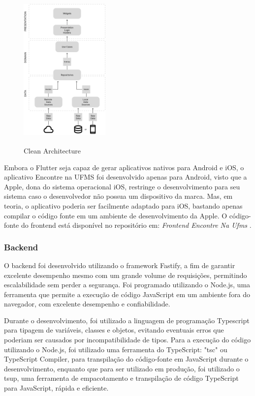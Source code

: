     \begin{figure}[h]
        \centering
        \includegraphics[width=44mm,height=80mm]{imagens/cleanarch.png}
        \caption{\scriptsize Clean Architecture}
        \footnotesize  {}
        \label{fig:clean-architecture}
    \end{figure}

    \FloatBarrier

    Embora o Flutter seja capaz de gerar aplicativos nativos para Android e iOS, o aplicativo Encontre na UFMS foi desenvolvido apenas para Android, visto que a Apple, dona do sistema operacional iOS, restringe o desenvolvimento para seu sistema caso o desenvolvedor não possua um dispositivo da marca. Mas, em teoria, o aplicativo poderia ser facilmente adaptado para iOS, bastando apenas compilar o código fonte em um ambiente de desenvolvimento da Apple. O código-fonte do frontend está disponível no repositório em: \textit{Frontend Encontre Na Ufms} \cite{frontend}.

\subsubsection{Backend}

    O backend foi desenvolvido utilizando o framework Fastify, a fim de garantir excelente desempenho mesmo com um grande volume de requisições, permitindo escalabilidade sem perder a segurança. Foi programado utilizando o Node.js, uma ferramenta que permite a execução de código JavaScript em um ambiente fora do navegador, com excelente desempenho e confiabilidade. 
    
    Durante o desenvolvimento, foi utilizado a linguagem de programação Typescript para tipagem de variáveis, classes e objetos, evitando eventuais erros que poderiam ser causados por incompatibilidade de tipos. Para a execução do código utilizando o Node.js, foi utilizado uma ferramenta do TypeScript: "tsc" ou TypeScript Compiler, para transpilação do código-fonte em JavaScript durante o desenvolvimento, enquanto que para ser utilizado em produção, foi utilizado o tsup, uma ferramenta de empacotamento e transpilação de código TypeScript para JavaScript, rápida e eficiente.

